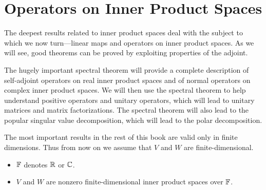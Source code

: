 \chapter{Operators on Inner Product Spaces}

The deepest results related to inner product spaces deal with the subject to
which we now turn---linear maps and operators on inner product spaces. As we
will see, good theorems can be proved by exploiting properties of the adjoint.

The hugely important spectral theorem will provide a complete description of
self-adjoint operators on real inner product spaces and of normal operators on
complex inner product spaces. We will then use the spectral theorem to help
understand positive operators and unitary operators, which will lead to unitary
matrices and matrix factorizations. The spectral theorem will also lead to the
popular singular value decomposition, which will lead to the polar
decomposition.

The most important results in the rest of this book are valid only in finite
dimensions. Thus from now on we assume that $V$ and $W$ are finite-dimensional.

\begin{definition*}\leavevmode
\begin{itemize}
\item $\mathbb{F}$ denotes $\mathbb{R}$ or $\mathbb{C}$.
\item $V$ and $W$ are nonzero finite-dimensional inner product spaces over $\mathbb{F}$.
\end{itemize}
\end{definition*}
